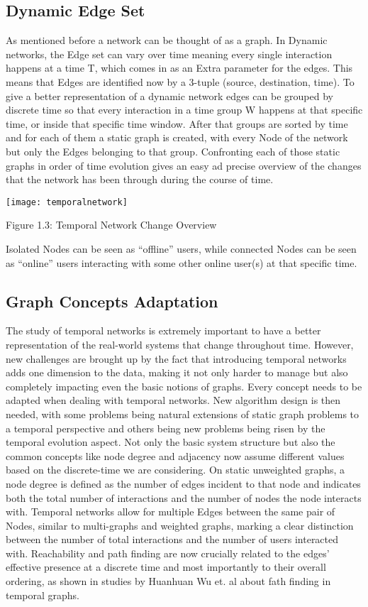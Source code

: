 \subsection{Dynamic Edge Set}
\label{sec:dygraphs}
As mentioned before a network can be thought of as a graph. In Dynamic networks, the Edge set can vary over time meaning every single interaction happens at a time T, which comes in as an Extra parameter for the edges. This means that Edges are identified now by a 3-tuple (source, destination, time). To give a better representation of a dynamic network edges can be grouped by discrete time so that every interaction in a time group W happens at that specific time, or inside that specific time window. After that groups are sorted by time and for each of them a static graph is created, with every Node of the network but only the Edges belonging to that group. Confronting each of those static graphs in order of time evolution gives an easy ad precise overview of the changes that the network has been through during the course of time.

\texttt{[image: temporalnetwork]}

\begin{center}
    Figure 1.3: Temporal Network Change Overview
\end{center}

Isolated Nodes can be seen as “offline” users, while connected Nodes can be seen as “online” users interacting with some other online user(s) at that specific time. 

\subsection{Graph Concepts Adaptation}
\label{sec:dygraphs2}
The study of temporal networks is extremely important to have a better representation of the real-world systems that change throughout time. However, new challenges are brought up by the fact that introducing temporal networks adds one dimension to the data, making it not only harder to manage but also completely impacting even the basic notions of graphs. Every concept needs to be adapted when dealing with temporal networks. New algorithm design is then needed, with some problems being natural extensions of static graph problems to a temporal perspective and others being new problems being risen by the temporal evolution aspect. 
Not only the basic system structure but also the common concepts like node degree and adjacency now assume different values based on the discrete-time we are considering. On static unweighted graphs, a node degree is defined as the number of edges incident to that node and indicates both the total number of interactions and the number of nodes the node interacts with. Temporal networks allow for multiple Edges between the same pair of Nodes, similar to multi-graphs and weighted graphs, marking a clear distinction between the number of total interactions and the number of users interacted with. Reachability and path finding are now crucially related to the edges' effective presence at a discrete time and most importantly to their overall ordering, as shown in studies by Huanhuan Wu et. al about fath finding in temporal graphs.
\cite{10.14778/2732939.2732945}

